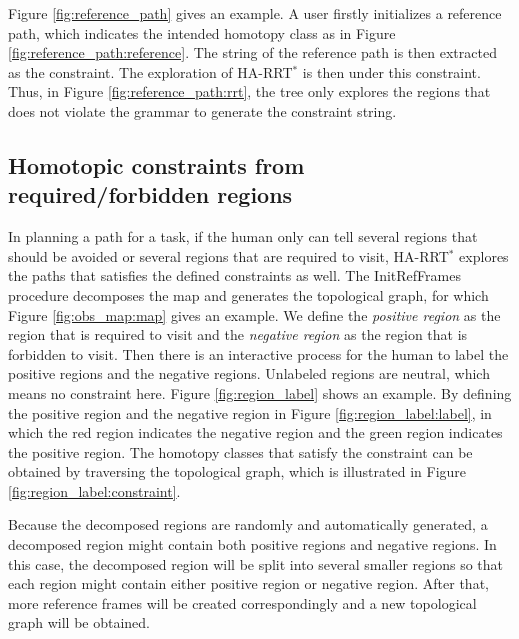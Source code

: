 \documentclass[letterpaper, 10 pt, conference]{ieeeconf}
\begin{document}
Figure \ref{fig:reference_path} gives an example.
A user firstly initializes a reference path, which indicates the intended homotopy class as in Figure \ref{fig:reference_path:reference}.
The string of the reference path is then extracted as the constraint.
The exploration of HA-RRT$^{*}$ is then under this constraint.
Thus, in Figure \ref{fig:reference_path:rrt}, the tree only explores the regions that does not violate the grammar to generate the constraint string.

\subsection{Homotopic constraints from required/forbidden regions}

In planning a path for a task, if the human only can tell several regions that should be avoided or several regions that are required to visit, HA-RRT$^{*}$ explores the paths that satisfies the defined constraints as well.
The {\sc InitRefFrames} procedure decomposes the map and generates the topological graph, for which Figure \ref{fig:obs_map:map} gives an example.
We define the \emph{positive region} as the region that is required to visit and the \emph{negative region} as the region that is forbidden to visit.
Then there is an interactive process for the human to label the positive regions and the negative regions.
Unlabeled regions are neutral, which means no constraint here.
Figure \ref{fig:region_label} shows an example.
By defining the positive region and the negative region in Figure \ref{fig:region_label:label}, in which the red region indicates the negative region and the green region indicates the positive region.
The homotopy classes that satisfy the constraint can be obtained by traversing the topological graph, which is illustrated in Figure \ref{fig:region_label:constraint}.

Because the decomposed regions are randomly and automatically generated, a decomposed region might contain both positive regions and negative regions.
In this case, the decomposed region will be split into several smaller regions so that each region might contain either positive region or negative region.
After that, more reference frames will be created correspondingly and a new topological graph will be obtained.
\end{document}
